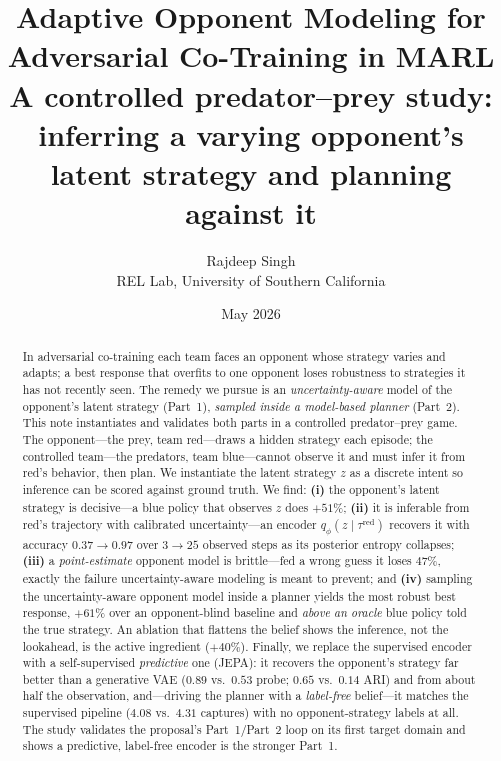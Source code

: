 \documentclass[11pt]{article}
\title{Adaptive Opponent Modeling for Adversarial Co-Training in MARL\\[0.3em]
\large A controlled predator--prey study: inferring a varying opponent's\\
latent strategy and planning against it}
\author{Rajdeep Singh \\ REL Lab, University of Southern California}
\date{May 2026}
\newcommand{\red}[1]{\textcolor{red1}{#1}}
\newcommand{\blue}[1]{\textcolor{blue1}{#1}}
\newcommand{\tred}{\tau^{\mathrm{red}}}
\newcommand{\zlat}{z}
\begin{document}
\maketitle

\begin{abstract}
In adversarial co-training each team faces an opponent whose strategy varies and
adapts; a best response that overfits to one opponent loses robustness to
strategies it has not recently seen. The remedy we pursue is an
\emph{uncertainty-aware} model of the opponent's latent strategy (Part~1),
\emph{sampled inside a model-based planner} (Part~2). This note instantiates and
validates both parts in a controlled predator--prey game. The opponent---the prey,
team \red{red}---draws a hidden strategy each episode; the controlled team---the
predators, team \blue{blue}---cannot observe it and must infer it from
\red{red}'s behavior, then plan. We instantiate the latent strategy
$\zlat$ as a discrete intent so inference can be scored against ground truth.
We find: \textbf{(i)} the opponent's latent strategy is decisive---a \blue{blue}
policy that observes $\zlat$ does $+51\%$; \textbf{(ii)} it is inferable from
\red{red}'s trajectory with calibrated uncertainty---an encoder
$q_\phi(\zlat\mid\tred)$ recovers it with accuracy $0.37\!\to\!0.97$ over
$3\!\to\!25$ observed steps as its posterior entropy collapses; \textbf{(iii)} a
\emph{point-estimate} opponent model is brittle---fed a wrong guess it loses
$47\%$, exactly the failure uncertainty-aware modeling is meant to prevent; and
\textbf{(iv)} sampling the uncertainty-aware opponent model inside a planner
yields the most robust best response, $+61\%$ over an opponent-blind baseline and
\emph{above an oracle} \blue{blue} policy told the true strategy. An ablation that
flattens the belief shows the inference, not the lookahead, is the active
ingredient ($+40\%$). Finally, we replace the supervised encoder with a
self-supervised \emph{predictive} one (JEPA): it recovers the opponent's strategy
far better than a generative VAE ($0.89$ vs.\ $0.53$ probe; $0.65$ vs.\ $0.14$
ARI) and from about half the observation, and---driving the planner with a
\emph{label-free} belief---it matches the supervised pipeline ($4.08$ vs.\ $4.31$
captures) with no opponent-strategy labels at all. The study validates the
proposal's Part~1/Part~2 loop on its first target domain and shows a predictive,
label-free encoder is the stronger Part~1.
\end{abstract}


\end{document}
